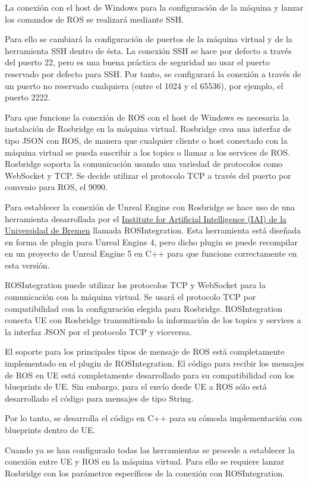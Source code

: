 \documentclass[a4paper, 12pt, spanish, twoside]{article}
\begin{document}
La conexión con el host de Windows para la configuración de la máquina y lanzar los comandos de ROS se realizará mediante SSH.  

Para ello se cambiará la configuración de puertos de la máquina virtual y de la herramienta SSH dentro de ésta. La conexión SSH se hace por defecto a través del puerto 22, pero es una buena práctica de seguridad no usar el puerto reservado por defecto para SSH. Por tanto, se configurará la conexión a través de un puerto no reservado cualquiera (entre el 1024 y el 65536), por ejemplo, el puerto 2222. 

Para que funcione la conexión de ROS con el host de Windows es necesaria la instalación de Rosbridge en la máquina virtual. Rosbridge crea una interfaz de tipo JSON con ROS, de manera que cualquier cliente o host conectado con la máquina virtual se pueda suscribir a los topics o llamar a los services de ROS. Rosbridge soporta la comunicación usando una variedad de protocolos como WebSocket y TCP. Se decide utilizar el protocolo TCP a través del puerto por convenio para ROS, el 9090. 

Para establecer la conexión de Unreal Engine con Rosbridge se hace uso de una herramienta desarrollada por el \href{https://ai.uni-bremen.de/}{Institute for Artificial Intelligence (IAI) de la Universidad de Bremen} llamada ROSIntegration. Esta herramienta está diseñada en forma de plugin para Unreal Engine 4, pero dicho plugin se puede recompilar en un proyecto de Unreal Engine 5 en C++ para que funcione correctamente en esta versión. 

ROSIntegration puede utilizar los protocolos TCP y WebSocket para la comunicación con la máquina virtual. Se usará el protocolo TCP por compatibilidad con la configuración elegida para Rosbridge. ROSIntegration conecta UE con Rosbridge transmitiendo la información de los topics y services a la interfaz JSON por el protocolo TCP y viceversa. 

El soporte para los principales tipos de mensaje de ROS está completamente implementado en el plugin de ROSIntegration. El código para recibir los mensajes de ROS en UE está completamente desarrollado para su compatibilidad con los blueprints de UE. Sin embargo, para el envío desde UE a ROS sólo está desarrollado el código para mensajes de tipo String.  

Por lo tanto, se desarrolla el código en C++ para su cómoda implementación con blueprints dentro de UE. 

Cuando ya se han configurado todas las herramientas se procede a establecer la conexión entre UE y ROS en la máquina virtual. Para ello se requiere lanzar Rosbridge con los parámetros específicos de la conexión con ROSIntegration.  
\end{document}
